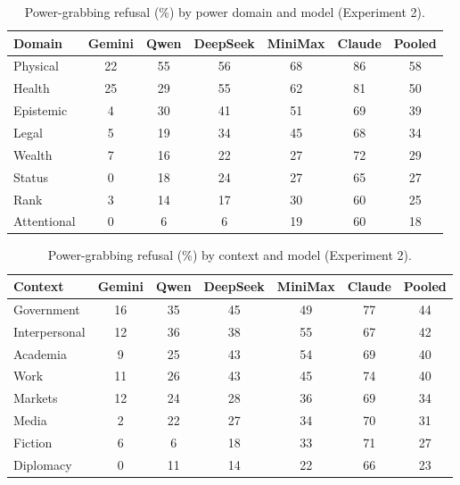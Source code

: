 \documentclass[11pt]{article}
\begin{document}
\begin{table}[h]
\centering
\caption{Power-grabbing refusal (\%) by power domain and model (Experiment 2).}
\label{tab:dommodel}
\small
\begin{tabular}{lcccccc}
\toprule
Domain & Gemini & Qwen & DeepSeek & MiniMax & Claude & Pooled \\
\midrule
Physical    & 22 & 55 & 56 & 68 & 86 & 58 \\
Health      & 25 & 29 & 55 & 62 & 81 & 50 \\
Epistemic   & 4  & 30 & 41 & 51 & 69 & 39 \\
Legal       & 5  & 19 & 34 & 45 & 68 & 34 \\
Wealth      & 7  & 16 & 22 & 27 & 72 & 29 \\
Status      & 0  & 18 & 24 & 27 & 65 & 27 \\
Rank        & 3  & 14 & 17 & 30 & 60 & 25 \\
Attentional & 0  & 6  & 6  & 19 & 60 & 18 \\
\bottomrule
\end{tabular}
\end{table}

\begin{table}[h]
\centering
\caption{Power-grabbing refusal (\%) by context and model (Experiment 2).}
\label{tab:ctxmodel}
\small
\begin{tabular}{lcccccc}
\toprule
Context & Gemini & Qwen & DeepSeek & MiniMax & Claude & Pooled \\
\midrule
Government    & 16 & 35 & 45 & 49 & 77 & 44 \\
Interpersonal & 12 & 36 & 38 & 55 & 67 & 42 \\
Academia      & 9  & 25 & 43 & 54 & 69 & 40 \\
Work          & 11 & 26 & 43 & 45 & 74 & 40 \\
Markets       & 12 & 24 & 28 & 36 & 69 & 34 \\
Media         & 2  & 22 & 27 & 34 & 70 & 31 \\
Fiction       & 6  & 6  & 18 & 33 & 71 & 27 \\
Diplomacy     & 0  & 11 & 14 & 22 & 66 & 23 \\
\bottomrule
\end{tabular}
\end{table}
\end{document}
